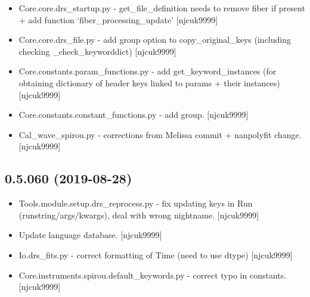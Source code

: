 \documentclass[a4paper,10pt,english]{report}
\begin{document}
\begin{itemize}
\item {} 
Core.core.drs\_startup.py - get\_file\_definition needs to remove fiber
if present + add function ‘fiber\_processing\_update’ {[}njcuk9999{]}

\item {} 
Core.core.drs\_file.py - add group option to copy\_original\_keys
(including checking \_check\_keyworddict) {[}njcuk9999{]}

\item {} 
Core.constants.param\_functions.py - add get\_keyword\_instances (for
obtaining dictionary of header keys linked to params + their
instances) {[}njcuk9999{]}

\item {} 
Core.constants.constant\_functions.py - add group. {[}njcuk9999{]}

\item {} 
Cal\_wave\_spirou.py - corrections from Melissa commit + nanpolyfit
change. {[}njcuk9999{]}

\end{itemize}


\subsection{0.5.060 (2019-08-28)}
\label{\detokenize{misc/changelog:id81}}\begin{itemize}
\item {} 
Tools.module.setup.drs\_reprocess.py - fix updating keys in Run
(runstring/args/kwargs), deal with wrong nightname. {[}njcuk9999{]}

\item {} 
Update language database. {[}njcuk9999{]}

\item {} 
Io.drs\_fits.py - correct formatting of Time (need to use dtype)
{[}njcuk9999{]}

\item {} 
Core.instruments.spirou.default\_keywords.py - correct typo in
constants. {[}njcuk9999{]}

\end{itemize}
\end{document}
